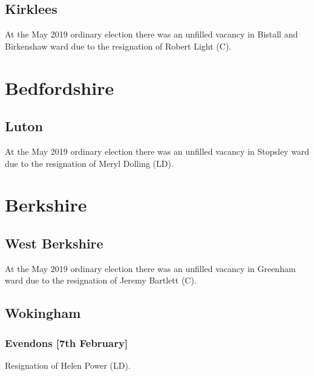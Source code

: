 \documentclass[a4paper,openany]{book}
\begin{document}
\begin{resultsiii}
\subsection*{Kirklees}

At the May 2019 ordinary election there was an unfilled vacancy in Bistall and Birkenshaw ward due to the resignation of Robert Light (C).

\section{Bedfordshire}

\subsection*{Luton}

At the May 2019 ordinary election there was an unfilled vacancy in Stopsley ward due to the resignation of Meryl Dolling (LD).

\section{Berkshire}

\subsection*{West Berkshire}

At the May 2019 ordinary election there was an unfilled vacancy in Greenham ward due to the resignation of Jeremy Bartlett (C).

\subsection*{Wokingham}

\subsubsection*{Evendons \hspace*{\fill}\nolinebreak[1]%
	\enspace\hspace*{\fill}
	[7th February]}


Resignation of Helen Power (LD).


\end{resultsiii}
\end{document}
